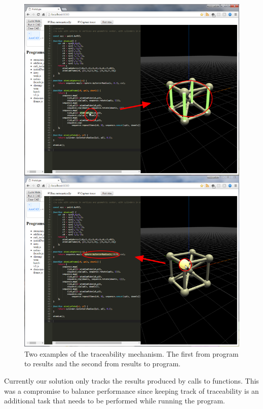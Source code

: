 \begin{figure}
  \centering
  \includegraphics[width=12cm]{./images/traceability_example}
  \caption{Two examples of the traceability mechanism. The first from program to results and the second from results to program.}
  \label{fig:trace:example}
\end{figure}

Currently our solution only tracks the results produced by calls to functions.
This was a compromise to balance performance since keeping track of traceability is an additional task that needs to be performed while running the program.

